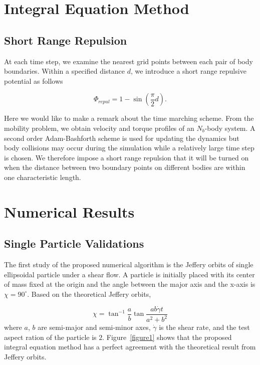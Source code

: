 \documentclass[lineno]{jfm}
\begin{document}
\section{\label{IEM}Integral Equation Method}



\subsection{Short Range Repulsion}

At each time step, we examine the nearest grid points between each pair of body  boundaries. Within a specified distance $d$, we introduce a short range repulsive potential as follows

\begin{equation}
\Phi_{repul} = 1- \sin\left(\frac{\pi}{2} d\right).
\end{equation}

Here we would like to make a remark about the time marching scheme. From the mobility problem, we obtain velocity and torque profiles of an $N_b$-body system. A second order Adam-Bashforth scheme is used for updating the dynamics but body collisions may occur during the simulation while a relatively large time step is chosen. We therefore impose a short range repulsion that it will be turned on when the distance between two boundary points on different bodies are within one characteristic length.


\section{\label{results}Numerical Results}

\subsection{Single Particle Validations}

The first study of the proposed numerical algorithm is the Jeffery orbits of single ellipsoidal particle under a shear flow. A particle is initially placed with its center of mass fixed at the origin and the angle between the major axis and the x-axis is $\chi = 90^\circ$. Based on the theoretical Jeffery orbits, 

\begin{equation}
\chi = \tan^{-1}\frac{a}{b}\tan \frac{ab \dot\gamma t}{a^2+b^2}
\end{equation}
%
where $a$, $b$ are semi-major and semi-minor axes, $\dot\gamma$ is the shear rate, and the test aspect ration of the particle is $2$. Figure~\ref{figure1} shows that the proposed integral equation method has a perfect agreement with the theoretical result from Jeffery orbits.
\end{document}
